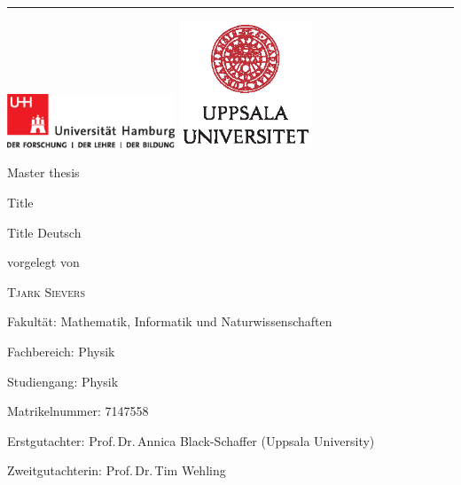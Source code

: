 \documentclass[main.tex]{subfiles}
\begin{document}
\begin{titlepage}
    \begin{minipage}{0.01\textwidth}
        \rule{1pt}{\textheight}
    \end{minipage}
    \begin{minipage}{0.9\textwidth}
        \includegraphics[width=5cm, valign=c]{images/logos/up-uhh-logo-u-2010-u-farbe-u-cmyk}
        \includegraphics[width=4cm, valign=c]{images/logos/UU_logo_CMYK}\par
        \vspace{4\baselineskip}

    \begin{FlushLeft}
        {\Large\textcolor{UHHred}{Master thesis}\par}

        {\Huge Title\par}

       \vspace{1\baselineskip}
        
        {\Large Title Deutsch\par}

        \vspace{4\baselineskip}

        vorgelegt von

        {\Large\textsc{Tjark Sievers}\par}
    \end{FlushLeft}

    \vfill
    
    \begin{FlushLeft}
        Fakultät: Mathematik, Informatik und Naturwissenschaften\par
        Fachbereich: Physik\par
        Studiengang: Physik\par
        Matrikelnummer: 7147558

        Erstgutachter: Prof.\,Dr.\,Annica Black-Schaffer (Uppsala University) \par
        Zweitgutachterin: Prof.\,Dr.\,Tim Wehling \par
    \end{FlushLeft}
    \end{minipage}
\end{titlepage}
\end{document}
